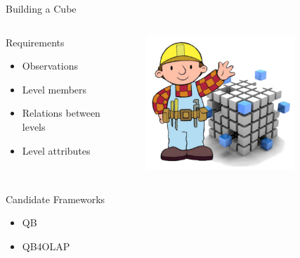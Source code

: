 \begin{frame}{Building a Cube}
\begin{columns}
\begin{block}{Requirements}
\begin{itemize}
    \item Observations
    \item Level members
    \item Relations between levels
    \item Level attributes
\end{itemize}
\end{block}
    \begin{figure}
        \includegraphics[width=0.8\textwidth]{images/cubeBuilder.png}
    \end{figure}
\end{columns}

\begin{block}{Candidate Frameworks}
\begin{itemize}
    \item QB\cite{dataCube}
    \item QB4OLAP\cite{DBLP:conf/semweb/EtcheverryV12}
\end{itemize}
\end{block}
\end{frame}

\newcommand{\patsec}{Patterns}
